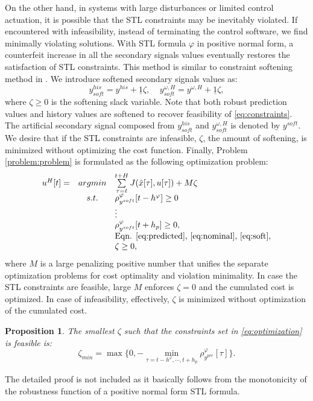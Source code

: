 \documentclass[letterpaper, 10 pt, conference]{ieeeconf}
\newtheorem{proposition}{Proposition}
\begin{document}
On the other hand, in systems with large disturbances or limited control actuation, it is possible that the STL constraints may be inevitably violated. 
If encountered with infeasibility, instead of terminating the control software, we find minimally violating solutions. With STL formula $\varphi$ in positive normal form, a counterfeit increase in all the secondary signals values eventually restores the satisfaction of STL constraints. This method is similar to constraint softening method in \cite{kerrigan2000soft}. We introduce softened secondary signals values as:
\begin{equation}
\label{eq:soft}
y^{his}_{soft}=y^{his}+\underline{1} \zeta,
~~~~~
y^{\omega,H}_{soft}=y^{\omega,H}+\underline{1} \zeta,
\end{equation}
where $\zeta \geq 0$ is the softening slack variable. Note that both robust prediction values and history values are softened to recover feasibility of \eqref{eq:constraints}. The artificial secondary signal composed from $y^{his}_{soft}$ and $y^{\omega,H}_{soft}$ is denoted by $y^{soft}$. 
We desire that if the STL constraints are infeasible, $\zeta$, the amount of softening, is minimized without optimizing the cost function. Finally, Problem \ref{problem:problem} is formulated as the following optimization problem:
\begin{equation}
\label{eq:optimization}
\begin{array}{ccl}
u^H[t]= & argmin & \sum \limits_{\tau=t}^{t+H} J(\hat{x}[\tau],u[\tau]) + M \zeta \\
& s.t.&  \rho_{y^{soft}}^\varphi[t-h^\varphi] \geq0 \\
& & \vdots \\
& &  \rho_{y^{soft}}^\varphi[t+h_p] \geq 0, \\
& & \text {Eqn. \eqref{eq:predicted}, \eqref{eq:nominal}, \eqref{eq:soft}},  \\
& & \zeta \geq 0,
\end{array}
\end{equation}
where $M$ is a large penalizing positive number that unifies the separate optimization problems for cost optimality and violation minimality. In case the STL constraints are feasible, large $M$ enforces $\zeta=0$ and the cumulated cost is optimized. In case of infeasibility, effectively, $\zeta$ is minimized without optimization of the cumulated cost.


\begin{proposition}
The smallest $\zeta$ such that the constraints set in \eqref{eq:optimization} is feasible is:
\begin{equation}
\zeta_{min}= \max\{0,-\underset{\tau=t-h^\varphi,\cdots,t+h_p}\min \rho_{y^{pre}}^\varphi[\tau] \}.
\end{equation}
\end{proposition}
The detailed proof is not included as it basically follows from the monotonicity of the robustness function of a positive normal form STL formula. 
\end{document}
